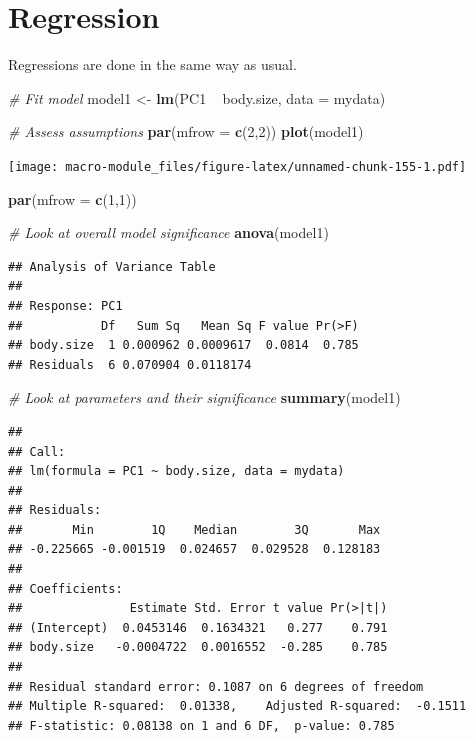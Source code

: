 \documentclass[]{book}
\newenvironment{Shaded}{\begin{snugshade}}{\end{snugshade}}
\newcommand{\KeywordTok}[1]{\textcolor[rgb]{0.13,0.29,0.53}{\textbf{{#1}}}}
\newcommand{\DataTypeTok}[1]{\textcolor[rgb]{0.13,0.29,0.53}{{#1}}}
\newcommand{\DecValTok}[1]{\textcolor[rgb]{0.00,0.00,0.81}{{#1}}}
\newcommand{\StringTok}[1]{\textcolor[rgb]{0.31,0.60,0.02}{{#1}}}
\newcommand{\CommentTok}[1]{\textcolor[rgb]{0.56,0.35,0.01}{\textit{{#1}}}}
\newcommand{\NormalTok}[1]{{#1}}
\begin{document}
\section{Regression}\label{regression}

Regressions are done in the same way as usual.

\begin{Shaded}
\begin{Highlighting}[]
\CommentTok{# Fit model}
\NormalTok{model1 <-}\StringTok{ }\KeywordTok{lm}\NormalTok{(PC1 ~}\StringTok{ }\NormalTok{body.size, }\DataTypeTok{data =} \NormalTok{mydata)}

\CommentTok{# Assess assumptions}
\KeywordTok{par}\NormalTok{(}\DataTypeTok{mfrow =} \KeywordTok{c}\NormalTok{(}\DecValTok{2}\NormalTok{,}\DecValTok{2}\NormalTok{))}
\KeywordTok{plot}\NormalTok{(model1)}
\end{Highlighting}
\end{Shaded}

\texttt{[image: macro-module\_files/figure-latex/unnamed-chunk-155-1.pdf]}

\begin{Shaded}
\begin{Highlighting}[]
\KeywordTok{par}\NormalTok{(}\DataTypeTok{mfrow =} \KeywordTok{c}\NormalTok{(}\DecValTok{1}\NormalTok{,}\DecValTok{1}\NormalTok{))}

\CommentTok{# Look at overall model significance}
\KeywordTok{anova}\NormalTok{(model1)}
\end{Highlighting}
\end{Shaded}

\begin{verbatim}
## Analysis of Variance Table
## 
## Response: PC1
##           Df   Sum Sq   Mean Sq F value Pr(>F)
## body.size  1 0.000962 0.0009617  0.0814  0.785
## Residuals  6 0.070904 0.0118174
\end{verbatim}

\begin{Shaded}
\begin{Highlighting}[]
\CommentTok{# Look at parameters and their significance}
\KeywordTok{summary}\NormalTok{(model1)}
\end{Highlighting}
\end{Shaded}

\begin{verbatim}
## 
## Call:
## lm(formula = PC1 ~ body.size, data = mydata)
## 
## Residuals:
##       Min        1Q    Median        3Q       Max 
## -0.225665 -0.001519  0.024657  0.029528  0.128183 
## 
## Coefficients:
##               Estimate Std. Error t value Pr(>|t|)
## (Intercept)  0.0453146  0.1634321   0.277    0.791
## body.size   -0.0004722  0.0016552  -0.285    0.785
## 
## Residual standard error: 0.1087 on 6 degrees of freedom
## Multiple R-squared:  0.01338,    Adjusted R-squared:  -0.1511 
## F-statistic: 0.08138 on 1 and 6 DF,  p-value: 0.785
\end{verbatim}
\end{document}
